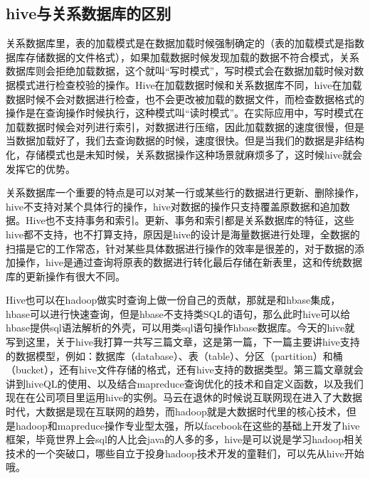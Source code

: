 \subsection{hive与关系数据库的区别}
\par 关系数据库里，表的加载模式是在数据加载时候强制确定的（表的加载模式是指数据库存储数据的文件格式），如果加载数据时候发现加载的数据不符合模式，关系数据库则会拒绝加载数据，这个就叫“写时模式”，写时模式会在数据加载时候对数据模式进行检查校验的操作。Hive在加载数据时候和关系数据库不同，hive在加载数据时候不会对数据进行检查，也不会更改被加载的数据文件，而检查数据格式的操作是在查询操作时候执行，这种模式叫“读时模式”。在实际应用中，写时模式在加载数据时候会对列进行索引，对数据进行压缩，因此加载数据的速度很慢，但是当数据加载好了，我们去查询数据的时候，速度很快。但是当我们的数据是非结构化，存储模式也是未知时候，关系数据操作这种场景就麻烦多了，这时候hive就会发挥它的优势。
\par 关系数据库一个重要的特点是可以对某一行或某些行的数据进行更新、删除操作，hive不支持对某个具体行的操作，hive对数据的操作只支持覆盖原数据和追加数据。Hive也不支持事务和索引。更新、事务和索引都是关系数据库的特征，这些hive都不支持，也不打算支持，原因是hive的设计是海量数据进行处理，全数据的扫描是它的工作常态，针对某些具体数据进行操作的效率是很差的，对于数据的添加操作，hive是通过查询将原表的数据进行转化最后存储在新表里，这和传统数据库的更新操作有很大不同。
\par Hive也可以在hadoop做实时查询上做一份自己的贡献，那就是和hbase集成，hbase可以进行快速查询，但是hbase不支持类SQL的语句，那么此时hive可以给hbase提供sql语法解析的外壳，可以用类sql语句操作hbase数据库。今天的hive就写到这里，关于hive我打算一共写三篇文章，这是第一篇，下一篇主要讲hive支持的数据模型，例如：数据库（database）、表（table）、分区（partition）和桶（bucket），还有hive文件存储的格式，还有hive支持的数据类型。第三篇文章就会讲到hiveQL的使用、以及结合mapreduce查询优化的技术和自定义函数，以及我们现在在公司项目里运用hive的实例。马云在退休的时候说互联网现在进入了大数据时代，大数据是现在互联网的趋势，而hadoop就是大数据时代里的核心技术，但是hadoop和mapreduce操作专业型太强，所以facebook在这些的基础上开发了hive框架，毕竟世界上会sql的人比会java的人多的多，hive是可以说是学习hadoop相关技术的一个突破口，哪些自立于投身hadoop技术开发的童鞋们，可以先从hive开始哦。



